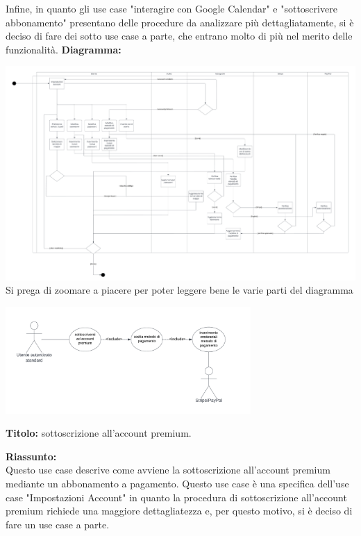 \begin{listaPersonale}[UC]{}
    Infine, in quanto gli use case "interagire con Google Calendar" e "sottoscrivere abbonamento" presentano delle procedure da analizzare più dettagliatamente, si è deciso di fare dei sotto use case a parte, che entrano molto di più nel merito delle funzionalità.
    \newpage
    \textbf{Diagramma:}
    \begin{center}
        \includegraphics[width=1.1\textwidth]{img/Diagrammi/DS/DS_ImpostazioneAccount.png}
        Si prega di zoomare a piacere per poter leggere bene le varie parti del diagramma
    \end{center}
    \begin{listaPersonale2}[UC] {}

        \begin{center}
            \includegraphics[width=0.7\textwidth]{img/Diagrammi/UseCases/UtentePremium.png}
        \end{center}


        \textbf{Titolo:} sottoscrizione all'account premium.

        \textbf{Riassunto:} \\
        Questo use case descrive come avviene la sottoscrizione all'account premium mediante un abbonamento a pagamento.
        Questo use case è una specifica dell'use case "Impostazioni Account" in quanto la procedura di sottoscrizione all'account premium richiede una maggiore dettagliatezza e, per questo motivo, si è deciso di fare un use case a parte.


\end{listaPersonale2}
\end{listaPersonale}
